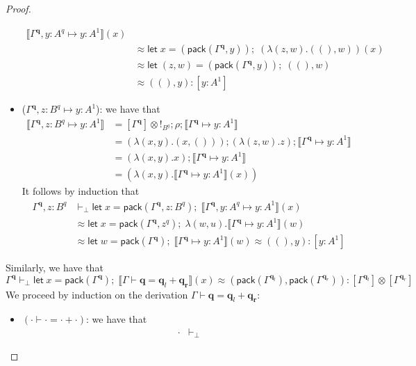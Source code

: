\documentclass[acmsmall,screen,review]{acmart}
\newcommand{\mb}[1]{\ensuremath{\mathbf{#1}}}
\newcommand{\ms}[1]{\ensuremath{\mathsf{#1}}}
\newcommand{\letexpr}[3]{\ensuremath{\ms{let}\;#1 = #2;\;#3}}
\newcommand{\qsp}[4]{#1 \vdash #2 = #3 + #4}
\newcommand{\cwk}[2]{#1 \mapsto #2}
\newcommand{\dnt}[1]{\llbracket{#1}\rrbracket}
\newcommand{\tmor}[1]{{!}_{#1}}
\begin{document}
\begin{proof}
\begin{itemize}
\begin{align*}
        {\dnt{\cwk{\Gamma^{\mb{q}}, y : A^q}{y : A^1}}(x)} \\
      &\approx \letexpr{x}{(\ms{pack}(\Gamma^{\mb{q}}, y))}{(\lambda (z, w) . ((), w))(x)} \\
      &\approx \letexpr{(z, w)}{(\ms{pack}(\Gamma^{\mb{q}}, y))}{((), w)} \\
      &\approx ((), y)
      : [y : A^1]
    \end{align*}
    \item ($\cwk{\Gamma^{\mb{q}}, z : B^q}{y : A^1}$): we have that
    \begin{align*}
    \dnt{\cwk{\Gamma^{\mb{q}}, z : B^q}{y : A^1}}
    &= [\Gamma^{\mb{q}}] \otimes \tmor{B^q} ; \rho ; \dnt{\cwk{\Gamma^{\mb{q}}}{y : A^1}} \\
    &= (\lambda (x, y) . (x, ())) ; (\lambda (z, w) . z) ; \dnt{\cwk{\Gamma^{\mb{q}}}{y : A^1}} \\
    &= (\lambda (x, y) . x) ; \dnt{\cwk{\Gamma^{\mb{q}}}{y : A^1}} \\
    &= (\lambda (x, y) . \dnt{\cwk{\Gamma^{\mb{q}}}{y : A^1}}(x))
    \end{align*}
    It follows by induction that
    \begin{align*}
    \Gamma^{\mb{q}}, z : B^q & \vdash_\bot
    \letexpr{x}{\ms{pack}(\Gamma^{\mb{q}}, z : B^q)}  
      {\dnt{\cwk{\Gamma^{\mb{q}}, y : A^q}{y : A^1}}(x)} \\
    &\approx \letexpr{x}{\ms{pack}(\Gamma^{\mb{q}}, z^q)}  
        {\lambda (w, u) . \dnt{\cwk{\Gamma^{\mb{q}}}{y : A^1}}(w)} \\
    &\approx \letexpr{w}{\ms{pack}(\Gamma^{\mb{q}})}{\dnt{\cwk{\Gamma^{\mb{q}}}{y : A^1}}(w)}
      \approx ((), y)
      : [y : A^1]
    \end{align*}
  \end{itemize}
  Similarly, we have that
  \begin{equation*}
  \Gamma^{\mb{q}} \vdash_\bot 
    \letexpr{x}{\ms{pack}(\Gamma^{\mb{q}})}{\dnt{\qsp{\Gamma}{\mb{q}}{\mb{q}_l}{\mb{q_r}}}(x)}
    \approx (\ms{pack}(\Gamma^{\mb{q}_l}), \ms{pack}(\Gamma^{\mb{q}_r}))
    : [\Gamma^{\mb{q}_l}] \otimes [\Gamma^{\mb{q}_r}]
  \end{equation*}
  We proceed by induction on the derivation $\qsp{\Gamma}{\mb{q}}{\mb{q}_l}{\mb{q_r}}$:
  \begin{itemize}
    \item $(\qsp{\cdot}{\cdot}{\cdot}{\cdot})$: we have that
    \begin{align*}
      \cdot &\vdash_\bot 

\end{align*}
\end{itemize}
\end{proof}
\end{document}
